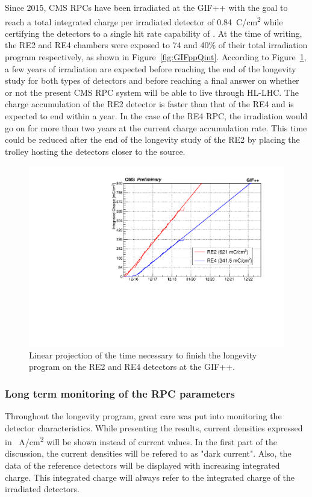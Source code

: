     Since 2015, CMS RPCs have been irradiated at the GIF++ with the goal to reach a total integrated charge per irradiated detector of \SI{0.84}{C/cm^2} while certifying the detectors to a single hit rate capability of . At the time of writing, the RE2 and RE4 chambers were exposed to 74 and 40\% of their total irradiation program respectively, as shown in Figure~\ref{fig:GIFppQint}. According to Figure~\ref{fig:GIFppQint-Extrapol}, a few years of irradiation are expected before reaching the end of the longevity study for both types of detectors and before reaching a final answer on whether or not the present CMS RPC system will be able to live through HL-LHC. The charge accumulation of the RE2 detector is faster than that of the RE4 and is expected to end within a year. In the case of the RE4 RPC, the irradiation would go on for more than two years at the current charge accumulation rate. This time could be reduced after the end of the longevity study of the RE2 by placing the trolley hosting the detectors closer to the source.
    
\endgroup
\newpage
	
	\begin{figure}[H]
        \centering
		\includegraphics[width = 0.7\linewidth]{fig/chapt5/Qint-vs-Time-Extrapolation.pdf}
		\caption{\label{fig:GIFppQint-Extrapol} Linear projection of the time necessary to finish the longevity program on the RE2 and RE4 detectors at the GIF++.}
	\end{figure}
	
		\subsubsection{Long term monitoring of the RPC parameters}
		\label{chapt5:sssec:longterm}
	
	Throughout the longevity program, great care was put into monitoring the detector characteristics. While presenting the results, current densities expressed in \si{\mu A/cm^2} will be shown instead of current values. In the first part of the discussion, the current densities will be refered to as "dark current". Also, the data of the reference detectors will be displayed with increasing integrated charge. This integrated charge will always refer to the integrated charge of the irradiated detectors.

